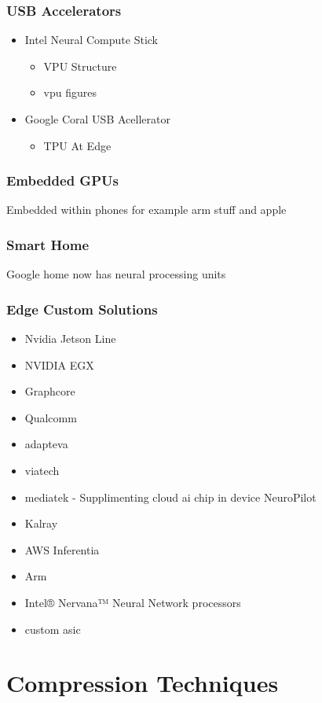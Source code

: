 \documentclass[12pt]{article}
\begin{document}
\subsubsection{USB Accelerators}
\begin{itemize}
\item
Intel Neural Compute Stick 
\begin{itemize}
\item
VPU Structure
\item
vpu figures
\end{itemize}
\item
Google Coral USB Acellerator
\begin{itemize}
\item
TPU At Edge

\end{itemize}
	

\end{itemize}

\subsubsection{Embedded GPUs}
Embedded within phones for example arm stuff and apple
\subsubsection{Smart Home}
Google home now has neural processing units
\subsubsection{Edge Custom Solutions}
\begin{itemize}
\item
Nvidia Jetson Line
\item
NVIDIA EGX
\item
Graphcore
\item
Qualcomm
\item
adapteva
\item
viatech
\item
mediatek - Supplimenting cloud ai chip in device NeuroPilot
\item
Kalray
\item
AWS Inferentia
\item
Arm
\item
Intel® Nervana™ Neural Network processors
\item 
custom asic
\end{itemize}

\section{Compression Techniques}
\end{document}
